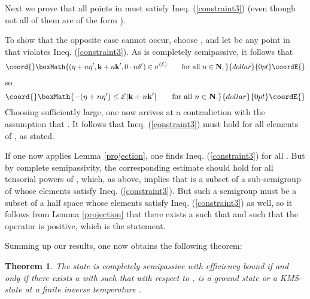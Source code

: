 \documentclass[a4paper,11pt]{article}
\newtheorem{theorem}{Theorem}[section]{\bf}{\it}
\renewcommand{\forall}{\mbox{for all}\,\,}
\def\E{{\cal E}}
\def\go{\omega}
\def\Halmos{\quad\hfill\myHighlight{$\Box$}\coordHE{}}
\def\impuls{k}
\def\naturals{{\bf N}}
\def\Rd{\reals^{1+s}}
\def\reals{{\bf R}}
\begin{document}
Next we prove that
all points in \coordHE{} must satisfy Ineq.
(\ref{constraint3}) (even though not all of them are
of the form \coordHE{}).

To show that the opposite case cannot occur, choose
\coordHE{}, and
let \myHighlight{$(\eta',{\bf\impuls}',\delta')$}\coordHE{} be any point
in \coordHE{} that violates
Ineq. (\ref{constraint3}). As \myHighlight{$\go$}\coordHE{} is completely
semipassive, it follows that
$$\coord{}\boxMath{(\eta+n\eta',{\bf\impuls}+n{\bf\impuls}',0\cdot n\delta')\in\sigma^{(\E)}
\qquad\forall n\in\naturals,}{dollar}{0pt}\coordE{}$$
so
$$\coord{}\boxMath{-(\eta+n\eta')\leq\E|{\bf\impuls}+n{\bf\impuls}'|
\qquad\forall n\in\naturals.}{dollar}{0pt}\coordE{}$$
Choosing \coordHE{} sufficiently
large, one now arrives at a contradiction with
the assumption that \myHighlight{$-\eta'>\E|{\bf\impuls}'|$}\coordHE{}. It follows
that Ineq. (\ref{constraint3}) must hold for all elements of
\coordHE{}, as stated.

If one now applies Lemma \ref{projection}, one finds Ineq.
(\ref{constraint3}) for all \coordHE{}.
But by complete semipassivity, the corresponding estimate
should hold for all tensorial powers of \myHighlight{$\go$}\coordHE{}, which, as above,
implies that \coordHE{} is a subset of
a sub-semigroup of \myHighlight{$\Rd$}\coordHE{} whose elements satisfy Ineq.
(\ref{constraint3}). But such a semigroup must be a subset of a
half space whose elements satisfy Ineq. (\ref{constraint3}) as well,
so it follows from Lemma \ref{projection} that there exists
a \myHighlight{${\bf u}\in\reals^s$}\coordHE{} such that \myHighlight{$|{\bf u}|\leq\E$}\coordHE{} and such that
the operator \coordHE{} is positive, which is the statement.

\Halmos

\bigskip
Summing up our results, one now obtains the following theorem:

\begin{theorem}\label{Hauptsatz}
The state \myHighlight{$\go$}\coordHE{} is completely semipassive with efficiency bound
\myHighlight{$\E$}\coordHE{} if and only if there exists a \myHighlight{${\bf u}\in\reals^s$}\coordHE{} with
\myHighlight{$|{\bf u}|\leq\E$}\coordHE{} such that with respect to \coordHE{},
\myHighlight{$\go$}\coordHE{} is a ground state or a KMS-state at a finite
inverse temperature \coordHE{}.
\end{theorem}
\end{document}
